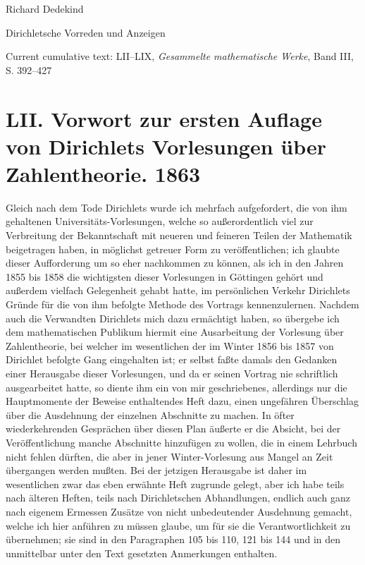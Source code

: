 \documentclass[11pt]{article}
\newcommand{\origpage}[1]{\par\vspace{0.25em}\noindent{\footnotesize\itshape [Gedruckte Seite #1]}\par\vspace{0.25em}}
\begin{document}
\begin{center}
{\Large Richard Dedekind}\par\vspace{0.3em}
{\large Dirichletsche Vorreden und Anzeigen}\par\vspace{0.2em}
{\normalsize Current cumulative text: LII--LIX, \textit{Gesammelte mathematische Werke}, Band III, S. 392--427}\par
\end{center}
\vspace{0.7em}
\origpage{392}
\section*{LII. Vorwort zur ersten Auflage von Dirichlets Vorlesungen über Zahlentheorie. 1863}

Gleich nach dem Tode Dirichlets wurde ich mehrfach aufgefordert, die von ihm gehaltenen Universitäts-Vorlesungen, welche so außerordentlich viel zur Verbreitung der Bekanntschaft mit neueren und feineren Teilen der Mathematik beigetragen haben, in möglichst getreuer Form zu veröffentlichen; ich glaubte dieser Aufforderung um so eher nachkommen zu können, als ich in den Jahren 1855 bis 1858 die wichtigsten dieser Vorlesungen in Göttingen gehört und außerdem vielfach Gelegenheit gehabt hatte, im persönlichen Verkehr Dirichlets Gründe für die von ihm befolgte Methode des Vortrags kennenzulernen. Nachdem auch die Verwandten Dirichlets mich dazu ermächtigt haben, so übergebe ich dem mathematischen Publikum hiermit eine Ausarbeitung der Vorlesung über Zahlentheorie, bei welcher im wesentlichen der im Winter 1856 bis 1857 von Dirichlet befolgte Gang eingehalten ist; er selbst faßte damals den Gedanken einer Herausgabe dieser Vorlesungen, und da er seinen Vortrag nie schriftlich ausgearbeitet hatte, so diente ihm ein von mir geschriebenes, allerdings nur die Hauptmomente der Beweise enthaltendes Heft dazu, einen ungefähren Überschlag über die Ausdehnung der einzelnen Abschnitte zu machen. In öfter wiederkehrenden Gesprächen über diesen Plan äußerte er die Absicht, bei der Veröffentlichung manche Abschnitte hinzufügen zu wollen, die in einem Lehrbuch nicht fehlen dürften, die aber in jener Winter-Vorlesung aus Mangel an Zeit übergangen werden mußten. Bei der jetzigen Herausgabe ist daher im wesentlichen zwar das eben erwähnte Heft zugrunde gelegt, aber ich habe teils nach älteren Heften, teils nach Dirichletschen Abhandlungen, endlich auch ganz nach eigenem Ermessen Zusätze von nicht unbedeutender Ausdehnung gemacht, welche ich hier anführen zu müssen glaube, um für sie die Verantwortlichkeit zu übernehmen; sie sind in den Paragraphen 105 bis 110, 121 bis 144 und in den unmittelbar unter den Text gesetzten Anmerkungen enthalten.
\end{document}
